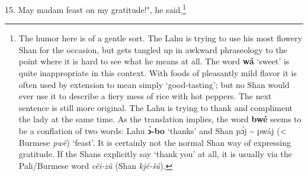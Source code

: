 15. May madam feast on my gratitude!", he said.\footnote{The humor here is of a gentle sort. The Lahu is trying to use his most flowery Shan for the occasion, but gets tangled up in awkward phraseology to the point where it is hard to see what he means at all. The word \textbf{wá} `sweet' is quite inappropriate in this context. With foods of pleasantly mild flavor it is often used by extension to mean simply `good-tasting'; but no Shan would ever use it to describe a fiery mess of rice with hot peppers. The next sentence is still more original. The Lahu is trying to thank and compliment the lady at the same time. As the translation implies, the word \textbf{bwé} seems to be a conflation of two words: Lahu \textbf{ɔ̀-bo} `thanks' and Shan pɔ́j \textasciitilde{} pwáj (< Burmese \textit{pwê}) `feast'. It is certainly not the normal Shan way of expressing gratitude. If the Shans explicitly say `thank you' at all, it is usually via the Pali/Burmese word \textit{cêi-zû} (Shan \textit{kjé-šú}).}

